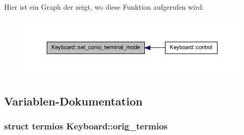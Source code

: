 Hier ist ein Graph der zeigt, wo diese Funktion aufgerufen wird:\nopagebreak
\begin{figure}[H]
\begin{center}
\leavevmode
\includegraphics[width=386pt]{namespace_keyboard_a6cc4fc3f7daf5630d0570f9d9d21d19c_icgraph}
\end{center}
\end{figure}




\subsection{Variablen-\/Dokumentation}
\hypertarget{namespace_keyboard_a8b623d5192e406c97c4e265dbe4c5f38}{
\subsubsection[{orig\_\-termios}]{\setlength{\rightskip}{0pt plus 5cm}struct termios {\bf Keyboard::orig\_\-termios}}}
\label{namespace_keyboard_a8b623d5192e406c97c4e265dbe4c5f38}
